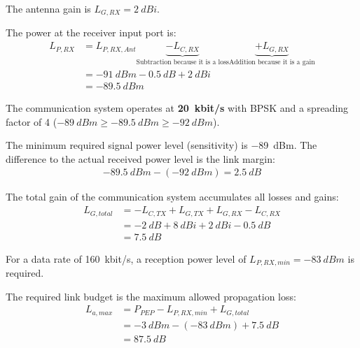 \begin{solution}
\begin{tasks}
		The antenna gain is $L_{G,RX} = \SI{2}{dBi}$.
		
		The power at the receiver input port is:
		\begin{equation*}
			\begin{split}
				L_{P,RX} &= L_{P,RX,Ant} \underbrace{- L_{C,RX}}_{\text{Subtraction because it is a loss}} \underbrace{+ L_{G,RX}}_{\text{Addition because it is a gain}} \\
				 &= \SI{-91}{dBm} - \SI{0.5}{dB} + \SI{2}{dBi} \\
				 &= \SI{-89.5}{dBm}
			\end{split}
		\end{equation*}
	
		\task
		The communication system operates at \textbf{\SI{20}{kbit/s}} with BPSK and a spreading factor of \num{4} ($\SI{-89}{dBm} \geq \SI{-89.5}{dBm} \geq \SI{-92}{dBm}$).
		
		\task
		The minimum required signal power level (sensitivity) is \SI{-89}{dBm}. The difference to the actual received power level is the link margin:
		\begin{equation*}
			\begin{split}
				\SI{-89.5}{dBm} - (\SI{-92}{dBm}) = \SI{2.5}{dB}
			\end{split}
		\end{equation*}
		
		\task
		The total gain of the communication system accumulates all losses and gains:
		\begin{equation*}
			\begin{split}
				L_{G,total} &= - L_{C,TX} + L_{G,TX} + L_{G,RX} - L_{C,RX} \\
				&= - \SI{2}{dB} + \SI{8}{dBi} + \SI{2}{dBi} - \SI{0.5}{dB} \\
				&= \SI{7.5}{dB}
			\end{split}
		\end{equation*}
		
		For a data rate of \SI{160}{kbit/s}, a reception power level of $L_{P,RX,min} = \SI{-83}{dBm}$ is required.
		
		The required link budget is the maximum allowed propagation loss:
		\begin{equation*}
			\begin{split}
				L_{a,max} &= P_{PEP} - L_{P,RX,min} + L_{G,total} \\
				&= \SI{-3}{dBm} - (\SI{-83}{dBm}) + \SI{7.5}{dB} \\
				&= \SI{87.5}{dB}
			\end{split}
		\end{equation*}
	

\end{tasks}
\end{solution}
